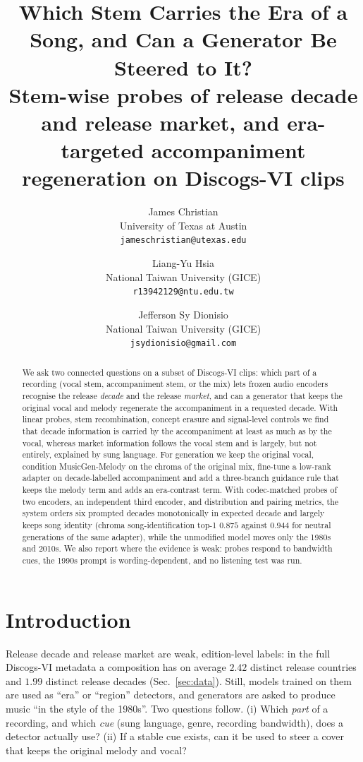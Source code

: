 \documentclass[10pt,twocolumn]{article}
\title{Which Stem Carries the Era of a Song, and Can a Generator Be Steered to It?\\
\large Stem-wise probes of release decade and release market, and era-targeted accompaniment regeneration on Discogs-VI clips}
\author{James Christian\\ {\small University of Texas at Austin}\\ {\small\texttt{jameschristian@utexas.edu}}
\and Liang-Yu Hsia\\ {\small National Taiwan University (GICE)}\\ {\small\texttt{r13942129@ntu.edu.tw}}
\and Jefferson Sy Dionisio\\ {\small National Taiwan University (GICE)}\\ {\small\texttt{jsydionisio@gmail.com}}}
\date{}
\begin{document}
\maketitle

\begin{abstract}
We ask two connected questions on a subset of Discogs-VI clips: which part of a recording (vocal stem, accompaniment stem, or the mix) lets frozen audio encoders recognise the release \emph{decade} and the release \emph{market}, and can a generator that keeps the original vocal and melody regenerate the accompaniment in a requested decade. With linear probes, stem recombination, concept erasure and signal-level controls we find that decade information is carried by the accompaniment at least as much as by the vocal, whereas market information follows the vocal stem and is largely, but not entirely, explained by sung language. For generation we keep the original vocal, condition MusicGen-Melody on the chroma of the original mix, fine-tune a low-rank adapter on decade-labelled accompaniment and add a three-branch guidance rule that keeps the melody term and adds an era-contrast term. With codec-matched probes of two encoders, an independent third encoder, and distribution and pairing metrics, the system orders six prompted decades monotonically in expected decade and largely keeps song identity (chroma song-identification top-1 $0.875$ against $0.944$ for neutral generations of the same adapter), while the unmodified model moves only the 1980s and 2010s. We also report where the evidence is weak: probes respond to bandwidth cues, the 1990s prompt is wording-dependent, and no listening test was run.
\end{abstract}

\section{Introduction}
Release decade and release market are weak, edition-level labels: in the full Discogs-VI metadata a composition has on average $2.42$ distinct release countries and $1.99$ distinct release decades (Sec.~\ref{sec:data}). Still, models trained on them are used as ``era'' or ``region'' detectors, and generators are asked to produce music ``in the style of the 1980s''. Two questions follow. (i) Which \emph{part} of a recording, and which \emph{cue} (sung language, genre, recording bandwidth), does a detector actually use? (ii) If a stable cue exists, can it be used to steer a cover that keeps the original melody and vocal?
\end{document}
